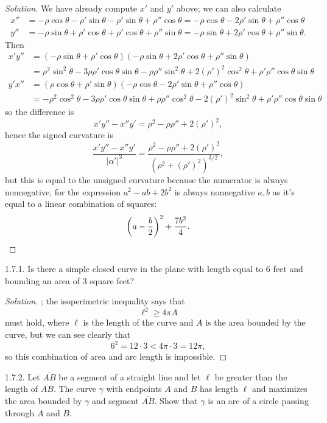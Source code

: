 \documentclass[11pt]{scrartcl}
\providecommand{\ol}{\overline}
\newenvironment{soln}{\begin{proof}[Solution]}{\end{proof}}
\begin{document}
\begin{soln}
	We have already compute $x'$ and $y'$ above; we can also calculate
	\begin{align*}
		x'' &= -\rho\cos\theta - \rho'\sin\theta - \rho'\sin\theta
		+ \rho''\cos\theta = -\rho\cos\theta - 2\rho'\sin\theta
		+ \rho''\cos\theta\\
		y'' &= -\rho\sin\theta + \rho'\cos\theta + \rho'\cos\theta
		+ \rho''\sin\theta = -\rho\sin\theta + 2\rho'\cos\theta
		+ \rho''\sin\theta.
	\end{align*}
	Then
	\begin{align*}
		x'y'' &= (-\rho\sin\theta + \rho'\cos\theta)
		(-\rho\sin\theta + 2\rho'\cos\theta + \rho''\sin\theta)\\
		&= \rho^2\sin^2\theta - 3\rho\rho'\cos\theta\sin\theta
		- \rho\rho''\sin^2\theta + 2(\rho')^2\cos^2\theta
		+ \rho'\rho''\cos\theta\sin\theta\\
		y'x'' &= (\rho\cos\theta + \rho'\sin\theta)
		(-\rho\cos\theta - 2\rho'\sin\theta + \rho''\cos\theta)\\
		&= -\rho^2\cos^2\theta - 3\rho\rho'\cos\theta\sin\theta
		+\rho\rho''\cos^2\theta - 2(\rho')^2\sin^2\theta
		+ \rho'\rho''\cos\theta\sin\theta
	\end{align*}
	so the difference is
	\[x'y'' - x''y' = \rho^2 - \rho\rho'' + 2(\rho')^2,\]
	hence the signed curvature is
	\[\frac{x'y'' - x''y'}{|\alpha'|^3} =
	\frac{\rho^2 - \rho\rho'' + 2(\rho')^2}{(\rho^2 + (\rho')^2)^{3/2}},\]
	but this is equal to the unsigned curvature
	because the numerator is always nonnegative, for the expression
	$a^2 - ab + 2b^2$ is always nonnegative $a,b$ as it's equal to
	a linear combination of squares:
	\[\left(a - \frac b2\right)^2 + \frac{7b^2}{4}.\qedhere\]
\end{soln}

\begin{problem*}1.7.1.
	Is there a simple closed curve in the plane
	with length equal to $6$ feet and bounding an area of $3$ square feet?
\end{problem*}

\begin{soln}
	; the isoperimetric inequality says that
	\[\ell^2 \ge 4\pi A\]
	must hold, where $\ell$ is the length of the curve and $A$ is
	the area bounded by the curve, but we can see clearly that
	\[6^2 = 12\cdot 3 < 4\pi\cdot 3 = 12\pi,\]
	so this combination of area and arc length is impossible.
\end{soln}

\begin{problem*}1.7.2.
	Let $\ol{AB}$ be a segment of a straight line and let $\ell$
	be greater than the length of $\ol{AB}$. The curve $\gamma$
	with endpoints $A$ and $B$ has length $\ell$ and maximizes
	the area bounded by $\gamma$ and segment $\ol{AB}$.
	Show that $\gamma$ is an arc of a circle passing through $A$ and $B$.
\end{problem*}
\end{document}

